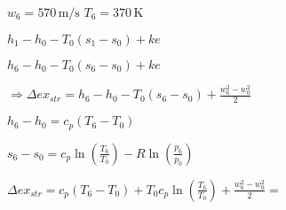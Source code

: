 \( w_6 = 570 \, \text{m/s} \)  
\( T_6 = 370 \, \text{K} \)  

\( h_1 - h_0 - T_0 (s_1 - s_0) + ke \)  

\( h_6 - h_0 - T_0 (s_6 - s_0) + ke \)  

\(\Rightarrow \Delta ex_{str} = h_6 - h_0 - T_0 (s_6 - s_0) + \frac{w_6^2 - w_0^2}{2} \)  

\( h_6 - h_0 = c_p (T_6 - T_0) \)  

\( s_6 - s_0 = c_p \ln \left( \frac{T_6}{T_0} \right) - R \ln \left( \frac{p_6}{p_0} \right) \)  

\( \Delta ex_{str} = c_p (T_6 - T_0) + T_0 c_p \ln \left( \frac{T_6}{T_0} \right) + \frac{w_6^2 - w_0^2}{2} = \)